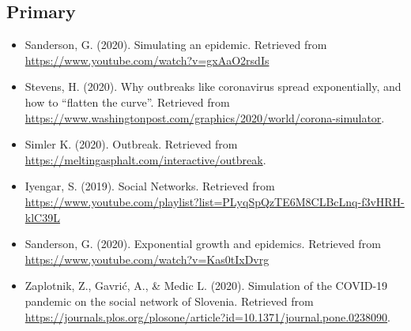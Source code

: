 \documentclass[12pt, a4paper]{extarticle}
\begin{document}
	    \subsection{Primary}
            \begin{itemize}
                \item Sanderson, G. (2020). Simulating an epidemic. Retrieved from \url{https://www.youtube.com/watch?v=gxAaO2rsdIs}
                
                \item Stevens, H. (2020). Why outbreaks like coronavirus spread exponentially, and how to “flatten the curve”. Retrieved from \url{https://www.washingtonpost.com/graphics/2020/world/corona-simulator}.
                
                \item Simler K. (2020). Outbreak. Retrieved from \url{https://meltingasphalt.com/interactive/outbreak}.
                
                \item Iyengar, S. (2019). Social Networks. Retrieved from \url{https://www.youtube.com/playlist?list=PLyqSpQzTE6M8CLBcLnq-f3vHRH-klC39L}
                
                \item Sanderson, G. (2020). Exponential growth and epidemics. Retrieved from \url{https://www.youtube.com/watch?v=Kas0tIxDvrg}
                
                \item Zaplotnik, Z., Gavrić, A., \& Medic L. (2020). Simulation of the COVID-19 pandemic on the social network of Slovenia. Retrieved from \url{https://journals.plos.org/plosone/article?id=10.1371/journal.pone.0238090}.
            \end{itemize}
            
\end{document}
